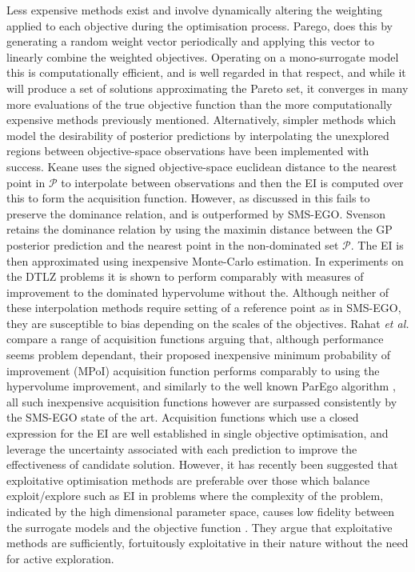 \documentclass[runningheads]{llncs}
\makeatletter
\newcommand*{\etal}{\textit{et al.}\@\xspace}
\makeatother
\begin{document}
Less expensive methods exist and involve dynamically altering the weighting applied to each objective during the optimisation process. Parego\cite{knowles2006parego}, does this by generating a random weight vector periodically and applying this vector to linearly combine the weighted objectives. Operating on a mono-surrogate model this is computationally efficient, and is well regarded in that respect, and while it will produce a set of solutions approximating the Pareto set, it converges in many more evaluations of the true objective function than the more computationally expensive methods previously mentioned. Alternatively, simpler methods which model the desirability of posterior predictions by interpolating the unexplored regions between objective-space observations have been implemented with success. Keane \cite{keane2006statistical} uses the signed objective-space euclidean distance to the nearest point in $\mathcal{P}$ to interpolate between observations and then the EI is computed over this to form the acquisition function. However, as discussed in \cite{wagner2010expected} this fails to preserve the dominance relation, and is outperformed by SMS-EGO. Svenson \cite{svenson2016multiobjective} retains the dominance relation by using the maximin distance between the GP posterior prediction and the nearest point in the non-dominated set $\mathcal{P}$. The EI is then approximated using inexpensive Monte-Carlo estimation. In experiments on the DTLZ problems it is shown to perform comparably with measures of improvement to the dominated hypervolume without the. Although neither of these interpolation methods require setting of a reference point as in SMS-EGO, they are susceptible to bias depending on the scales of the objectives. Rahat \etal \cite{rahat2017alternative} compare a range of acquisition functions arguing that, although performance seems problem dependant, their proposed inexpensive minimum probability of improvement (MPoI) acquisition function performs comparably to using the hypervolume improvement, and similarly to the well known ParEgo algorithm \cite{knowles2006parego}, all such inexpensive acquisition functions however are surpassed consistently by the SMS-EGO state of the art. Acquisition functions which use a closed expression for the EI are well established in single objective optimisation, and leverage the uncertainty associated with each prediction to improve the effectiveness of candidate solution. However, it has recently been suggested that exploitative optimisation methods are preferable over those which balance exploit/explore  such as EI in problems where the complexity of the problem, indicated by the high dimensional parameter space, causes low fidelity between the surrogate models and the objective function \cite{death2019greed}. They argue that exploitative methods are sufficiently, fortuitously exploitative in their nature without the need for active exploration. 
\end{document}
